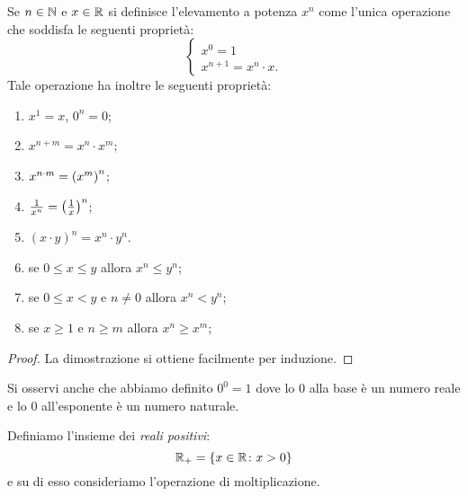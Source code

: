 \begin{theorem}
\label{th:moltiplicazione_ripetuta}%
Se $n\in {\mathbb N}$ e $x\in {\mathbb R}$ si definisce 
l'elevamento a potenza $x^n$ come l'unica operazione 
che soddisfa le seguenti proprietà:
\[
  \begin{cases}
    x^0 = 1 \\
    x^{n+1} = x^n \cdot x.
  \end{cases}  
\]
Tale operazione ha inoltre le seguenti proprietà:
\begin{enumerate}
  \item $x^1 = x$, $0^n = 0$;
  \item $x^{n+m} = x^n \cdot x^m$; 
  \item $x^{n\cdot m} = {\left( x^m \right)}^n$;
  \item $\frac{1}{x^n} = {\left( \frac 1 x \right)}^n$;
  \item $(x \cdot y)^n = x^n \cdot y^n$.
  \item se $0\le x \le y$ allora $x^n \le y^n$;
  \item se $0\le x < y$ e $n \neq 0$ allora $x^n < y^n$;
  \item se $x\ge 1$ e $n\ge m$ allora $x^n \ge x^m$;
\end{enumerate}
\end{theorem}
\begin{proof}
La dimostrazione si ottiene facilmente per induzione.
\end{proof}

Si osservi anche che abbiamo definito $0^0=1$ dove lo $0$ 
alla base è un numero reale e lo $0$ all'esponente 
è un numero naturale.


Definiamo l'insieme dei \emph{reali positivi}:
\[
{\mathbb R}_+ = {\left\{ x\in {\mathbb R}\colon x>0 \right\}}
\]
e su di esso consideriamo l'operazione di moltiplicazione.

